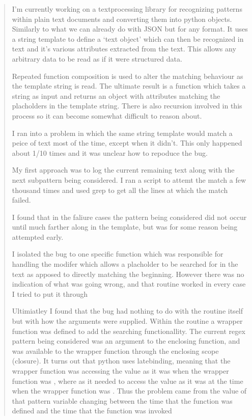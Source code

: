 \documentclass[letterpaper,10pt,english]{sphinxmanual}
\begin{document}
\begin{quote}

I’m currently working on a text\sphinxhyphen{}processing library for recognizing patterns within
plain text documents and converting them into python objects. Similarly to what
we can already do with JSON but for any format. It uses a string template to define a
‘text object’ which can then be recognized in text and it’s various attributes extracted
from the text. This allows any arbitrary data to be read as if it were structured data.

Repeated function composition is used to alter the matching behaviour as the template
string is read. The ultimate result is a function which takes a string as input and
returns an object with attributes matching the placholders in the template string.
There is also recursion involved in this process so it can become somewhat difficult
to reason about.

I ran into a problem in which the same string template would match a peice of text
most of the time, except when it didn’t. This only happened about 1/10 times and it
was unclear how to repoduce the bug.

My first approach was to log the current remaining text along with the next sub\sphinxhyphen{}pattern
being considered. I ran a script to attemt the match a few thousand times and used grep
to get all the lines at which the match failed.

I found that in the faliure cases the pattern being considered did not occur until
much farther along in the template, but was for some reason being attempted early.

I isolated the bug to one specific function which was responsible for handling the
 modifer which allows a placholder to be searched for in the text as apposed
to directly matching the beginning. However there was no indication of what was
going wrong, and that routine worked in every case I tried to put it through

Ultimiatley I found that the bug had nothing to do with the routine itself but with
how the arguments were supplied. Within the routine a wrapper function was defined to
add the searching functionallity. The current regex pattern being considered was an
argument to the enclosing function, and was available to the wrapper function through
the enclosing scope (closure). It turns out that python uses late\sphinxhyphen{}binding, meaning that
the wrapper function was accessing the value as it was when the wrapper function
was , where as it needed to access the value as it was at the time when the
wrapper function was . Thus the problem came from the value of that pattern
variable changing between the time that the function was defined and the time that the
function was invoked


\end{quote}
\end{document}
